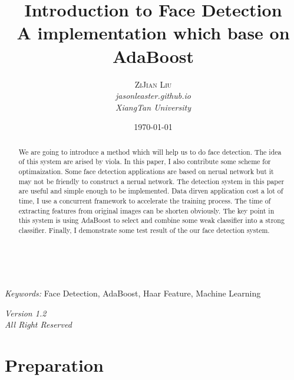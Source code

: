 \documentclass[a4paper, 11pt]{article} %
\title{\textbf{Introduction to Face Detection}\\ %
A implementation which base on AdaBoost} %
\author{\textsc{ZiJian Liu} %
\\{\textit{jasonleaster.github.io}}
\\{\textit{XiangTan University}}} %
\date{\today} %
\makeatletter
\renewcommand{\maketitle}{ %
\begin{flushright} %
{\LARGE\@title} %

\vspace{50pt} %

{\large\@author} %
\\\@date %

\vspace{40pt} %
\end{flushright}
}
\makeatother
\begin{document}
\maketitle %



\begin{abstract}
    We are going to introduce a method which will help us to do face detection. The idea of this system are arised by viola. In this paper, I also contribute some scheme for optimaization.
    Some face detection applications are based on nerual network but it may not be friendly to construct a nerual network. The detection system in this paper are useful and simple enough to be implemented. Data dirven application cost a lot of time, I use a concurrent framework to accelerate the training process. The time of extracting features from original images can be shorten obviously. The key point in this system is using AdaBoost to select and combine some weak classifier into a strong classifier. Finally, I demonstrate some test result of the our face detection system.

\end{abstract}

\hspace*{3,6mm}\textit{Keywords:} Face Detection, AdaBoost, Haar Feature, Machine Learning %

\vspace{30pt} %

\vspace*{\fill}
\begin{center}
    \textit{Version 1.2\\All Right Reserved}
\end{center}
\vspace*{\fill}

\clearpage
\tableofcontents

\clearpage

\section{Preparation}
\end{document}
